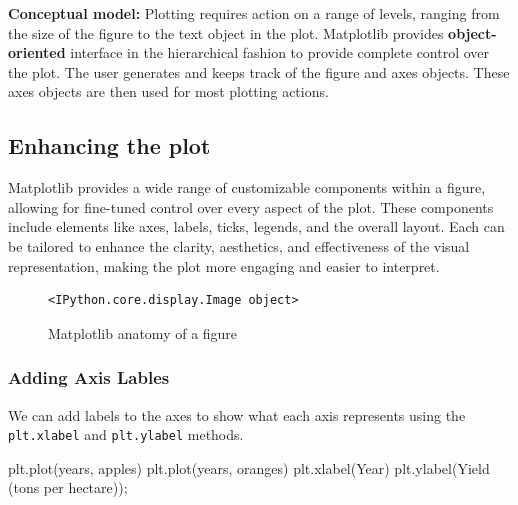 \documentclass[
  letterpaper,
  DIV=11,
  numbers=noendperiod]{scrreprt}
\newenvironment{Shaded}{\begin{snugshade}}{\end{snugshade}}
\newcommand{\NormalTok}[1]{\textcolor[rgb]{0.00,0.23,0.31}{#1}}
\newcommand{\OperatorTok}[1]{\textcolor[rgb]{0.37,0.37,0.37}{#1}}
\newcommand{\StringTok}[1]{\textcolor[rgb]{0.13,0.47,0.30}{#1}}
\begin{document}
\textbf{Conceptual model:} Plotting requires action on a range of
levels, ranging from the size of the figure to the text object in the
plot. Matplotlib provides \textbf{object-oriented} interface in the
hierarchical fashion to provide complete control over the plot. The user
generates and keeps track of the figure and axes objects. These axes
objects are then used for most plotting actions.

\hypertarget{enhancing-the-plot}{%
\subsection{Enhancing the plot}\label{enhancing-the-plot}}

Matplotlib provides a wide range of customizable components within a
figure, allowing for fine-tuned control over every aspect of the plot.
These components include elements like axes, labels, ticks, legends, and
the overall layout. Each can be tailored to enhance the clarity,
aesthetics, and effectiveness of the visual representation, making the
plot more engaging and easier to interpret.

\begin{figure}

{\centering 

\begin{verbatim}
<IPython.core.display.Image object>
\end{verbatim}

}

\caption{\label{fig-anatomy}Matplotlib anatomy of a figure}

\end{figure}

\hypertarget{adding-axis-lables}{%
\subsubsection{Adding Axis Lables}\label{adding-axis-lables}}

We can add labels to the axes to show what each axis represents using
the \texttt{plt.xlabel} and \texttt{plt.ylabel} methods.

\begin{Shaded}
\begin{Highlighting}[]
\NormalTok{plt.plot(years, apples)}
\NormalTok{plt.plot(years, oranges)}
\NormalTok{plt.xlabel(}\StringTok{\textquotesingle{}Year\textquotesingle{}}\NormalTok{)}
\NormalTok{plt.ylabel(}\StringTok{\textquotesingle{}Yield (tons per hectare)\textquotesingle{}}\NormalTok{)}\OperatorTok{;}
\end{Highlighting}
\end{Shaded}
\end{document}
